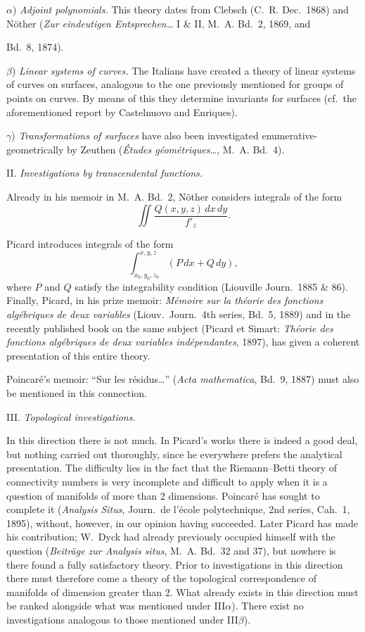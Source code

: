 \documentclass{article}
\begin{document}
$\alpha$) \emph{Adjoint polynomials.} This theory dates from Clebsch (C.~R. Dec.\ 1868) and Nöther (\emph{Zur eindeutigen Entsprechen\dots} I \& II, M.~A. Bd.~2, 1869, and

Bd.~8, 1874).

$\beta$) \emph{Linear systems of curves.} The Italians have created a theory of linear systems of curves on surfaces, analogous to the one previously mentioned for groups of points on curves. By means of this they determine invariants for surfaces (cf.\ the aforementioned report by Castelnuovo and Enriques).

$\gamma$) \emph{Transformations of surfaces} have also been investigated enumerative-geometrically by Zeuthen (\emph{Études géométriques\dots}, M.~A. Bd.~4).

II. \emph{Investigations by transcendental functions.}

Already in his memoir in M.~A. Bd.~2, Nöther considers integrals of the form
\[
\iint \frac{Q(x, y, z)\,dx\,dy}{f'_z}.
\]

Picard introduces integrals of the form
\[
\int_{x_0, y_0, z_0}^{x, y, z} (P\,dx + Q\,dy),
\]
where $P$ and $Q$ satisfy the integrability condition (Liouville Journ.\ 1885 \& 86). Finally, Picard, in his prize memoir: \emph{Mémoire sur la théorie des fonctions algébriques de deux variables} (Liouv.\ Journ.\ 4th series, Bd.~5, 1889) and in the recently published book on the same subject (Picard et Simart: \emph{Théorie des fonctions algébriques de deux variables indépendantes}, 1897), has given a coherent presentation of this entire theory.

Poincaré's memoir: “Sur les résidus\dots” (\emph{Acta mathematica}, Bd.~9, 1887) must also be mentioned in this connection.

III. \emph{Topological investigations.}

In this direction there is not much. In Picard's works there is indeed a good deal, but nothing carried out thoroughly, since he everywhere prefers the analytical presentation. The difficulty lies in the fact that the Riemann--Betti theory of connectivity numbers is very incomplete and difficult to apply when it is a question of manifolds of more than 2 dimensions. Poincaré has sought to complete it (\emph{Analysis Situs}, Journ.\ de l'école polytechnique, 2nd series, Cah.~1, 1895), without, however, in our opinion having succeeded. Later Picard has made his contribution; W.~Dyck had already previously occupied himself with the question (\emph{Beiträge zur Analysis situs}, M.~A. Bd.~32 and 37), but nowhere is there found a fully satisfactory theory. Prior to investigations in this direction there must therefore come a theory of the topological correspondence of manifolds of dimension greater than 2. What already exists in this direction must be ranked alongside what was mentioned under III$\alpha$). There exist no investigations analogous to those mentioned under III$\beta$).
\end{document}
